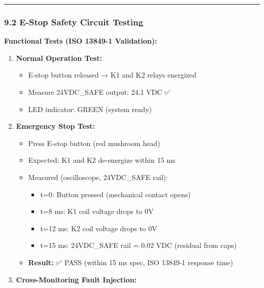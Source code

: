 \documentclass[
]{article}
\providecommand{\tightlist}{%
  \setlength{\itemsep}{0pt}\setlength{\parskip}{0pt}}
\begin{document}
\begin{center}\rule{0.5\linewidth}{0.5pt}\end{center}

\hypertarget{e-stop-safety-circuit-testing}{%
\subsubsection{9.2 E-Stop Safety Circuit
Testing}\label{e-stop-safety-circuit-testing}}

\textbf{Functional Tests (ISO 13849-1 Validation):}

\begin{enumerate}
\def\labelenumi{\arabic{enumi}.}
\tightlist
\item
  \textbf{Normal Operation Test:}

  \begin{itemize}
  \tightlist
  \item
    E-stop button released → K1 and K2 relays energized
  \item
    Measure 24VDC\_SAFE output: 24.1 VDC ✅
  \item
    LED indicator: GREEN (system ready)
  \end{itemize}
\item
  \textbf{Emergency Stop Test:}

  \begin{itemize}
  \tightlist
  \item
    Press E-stop button (red mushroom head)
  \item
    Expected: K1 and K2 de-energize within 15 ms
  \item
    Measured (oscilloscope, 24VDC\_SAFE rail):

    \begin{itemize}
    \tightlist
    \item
      t=0: Button pressed (mechanical contact opens)
    \item
      t=8 ms: K1 coil voltage drops to 0V
    \item
      t=12 ms: K2 coil voltage drops to 0V
    \item
      t=15 ms: 24VDC\_SAFE rail = 0.02 VDC (residual from caps)
    \end{itemize}
  \item
    \textbf{Result:} ✅ PASS (within 15 ms spec, ISO 13849-1 response
    time)
  \end{itemize}
\item
  \textbf{Cross-Monitoring Fault Injection:}


\end{enumerate}
\end{document}
